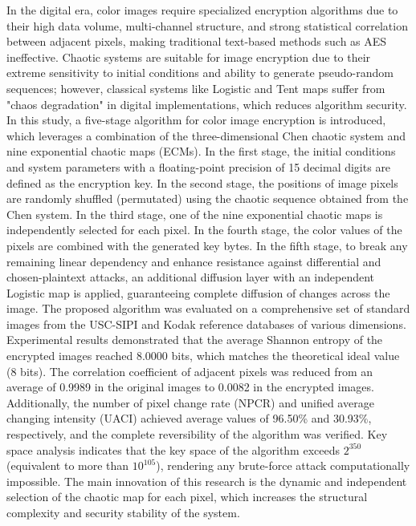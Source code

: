 In the digital era, color images require specialized encryption algorithms due to their high data volume, multi-channel structure, and strong statistical correlation between adjacent pixels, making traditional text-based methods such as AES ineffective. Chaotic systems are suitable for image encryption due to their extreme sensitivity to initial conditions and ability to generate pseudo-random sequences; however, classical systems like Logistic and Tent maps suffer from "chaos degradation" in digital implementations, which reduces algorithm security. In this study, a five-stage algorithm for color image encryption is introduced, which leverages a combination of the three-dimensional Chen chaotic system and nine exponential chaotic maps (ECMs). In the first stage, the initial conditions and system parameters with a floating-point precision of 15 decimal digits are defined as the encryption key. In the second stage, the positions of image pixels are randomly shuffled (permutated) using the chaotic sequence obtained from the Chen system. In the third stage, one of the nine exponential chaotic maps is independently selected for each pixel. In the fourth stage, the color values of the pixels are combined with the generated key bytes. In the fifth stage, to break any remaining linear dependency and enhance resistance against differential and chosen-plaintext attacks, an additional diffusion layer with an independent Logistic map is applied, guaranteeing complete diffusion of changes across the image. The proposed algorithm was evaluated on a comprehensive set of standard images from the USC-SIPI and Kodak reference databases of various dimensions. Experimental results demonstrated that the average Shannon entropy of the encrypted images reached 8.0000 bits, which matches the theoretical ideal value (8 bits). The correlation coefficient of adjacent pixels was reduced from an average of 0.9989 in the original images to 0.0082 in the encrypted images. Additionally, the number of pixel change rate (NPCR) and unified average changing intensity (UACI) achieved average values of 96.50\% and 30.93\%, respectively, and the complete reversibility of the algorithm was verified. Key space analysis indicates that the key space of the algorithm exceeds $2^{350}$ (equivalent to more than $10^{105}$), rendering any brute-force attack computationally impossible. The main innovation of this research is the dynamic and independent selection of the chaotic map for each pixel, which increases the structural complexity and security stability of the system.

